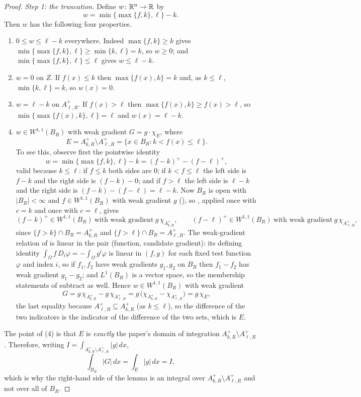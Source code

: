 \begin{proof}
\emph{Step 1: the truncation.}  Define $w\colon\mathbb{R}^n\to\mathbb{R}$ by
\[
w=\min\{\max\{f,k\},\ell\}-k .
\]
Then $w$ has the following four properties.
\begin{enumerate}
\item $0\le w\le\ell-k$ everywhere.  Indeed $\max\{f,k\}\ge k$ gives
  $\min\{\max\{f,k\},\ell\}\ge\min\{k,\ell\}=k$, so $w\ge0$; and
  $\min\{\max\{f,k\},\ell\}\le\ell$ gives $w\le\ell-k$.
\item $w=0$ on $Z$.  If $f(x)\le k$ then $\max\{f(x),k\}=k$ and, as $k\le\ell$,
  $\min\{k,\ell\}=k$, so $w(x)=0$.
\item $w=\ell-k$ on $A^+_{\ell,R}$.  If $f(x)>\ell$ then
  $\max\{f(x),k\}\ge f(x)>\ell$, so $\min\{\max\{f(x),k\},\ell\}=\ell$ and
  $w(x)=\ell-k$.
\item $w\in W^{1,1}(B_R)$ with weak gradient $G=g\cdot\chi_E$, where
\[
E=A^+_{k,R}\setminus A^+_{\ell,R}=\{x\in B_R:k<f(x)\le\ell\} .
\]
To see this, observe first the pointwise identity
\[
w=\min\{\max\{f,k\},\ell\}-k=(f-k)^+-(f-\ell)^+ ,
\]
valid because $k\le\ell$: if $f\le k$ both sides are $0$; if $k<f\le\ell$ the
left side is $f-k$ and the right side is $(f-k)-0$; and if $f>\ell$ the left side
is $\ell-k$ and the right side is $(f-k)-(f-\ell)=\ell-k$.  Now
$B_R$ is open with $|B_R|<\infty$ and $f\in W^{1,1}(B_R)$ with weak gradient $g$
(), so , applied once with
$c=k$ and once with $c=\ell$, gives
\[
(f-k)^+\in W^{1,1}(B_R)\ \text{with weak gradient}\ g\,\chi_{A^+_{k,R}},
\qquad
(f-\ell)^+\in W^{1,1}(B_R)\ \text{with weak gradient}\ g\,\chi_{A^+_{\ell,R}} ,
\]
since $\{f>k\}\cap B_R=A^+_{k,R}$ and $\{f>\ell\}\cap B_R=A^+_{\ell,R}$.  The
weak-gradient relation of  is linear in the pair
(function, candidate gradient): its defining identity
$\int_\Omega f\,D_i\varphi=-\int_\Omega g^i\varphi$ is linear in $(f,g)$ for each
fixed test function $\varphi$ and index $i$, so if $f_1,f_2$ have weak gradients
$g_1,g_2$ on $B_R$ then $f_1-f_2$ has weak gradient $g_1-g_2$; and $L^1(B_R)$ is
a vector space, so the membership statements of  subtract as
well.  Hence $w\in W^{1,1}(B_R)$ with weak gradient
\[
G=g\,\chi_{A^+_{k,R}}-g\,\chi_{A^+_{\ell,R}}
=g\,\bigl(\chi_{A^+_{k,R}}-\chi_{A^+_{\ell,R}}\bigr)=g\,\chi_{E} ,
\]
the last equality because $A^+_{\ell,R}\subseteq A^+_{k,R}$ (as $k\le\ell$), so
the difference of the two indicators is the indicator of the difference of the
two sets, which is $E$.
\end{enumerate}
The point of (4) is that $E$ is \emph{exactly} the paper's domain of integration
$A^+_{k,R}\setminus A^+_{\ell,R}$.  Therefore, writing
$I=\int_{A^+_{k,R}\setminus A^+_{\ell,R}}|g|\,dx$,
\[
\int_{B_R}|G|\,dx=\int_E|g|\,dx=I ,
\tag{1}
\]
which is why the right-hand side of the lemma is an integral over
$A^+_{k,R}\setminus A^+_{\ell,R}$ and not over all of $B_R$.


\end{proof}

